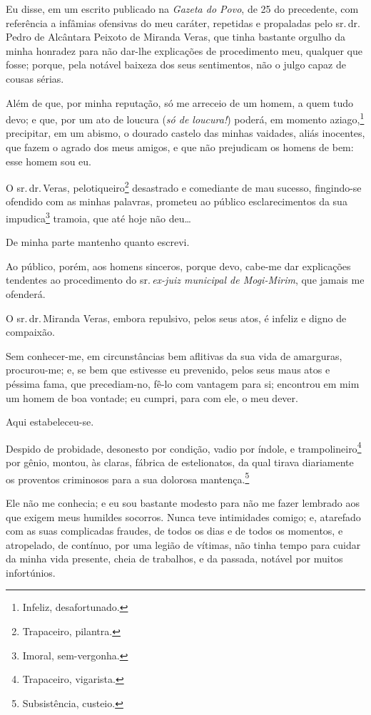 {Eu disse, em um escrito publicado na \emph{Gazeta do Povo}, de 25 do
precedente, com referência a infâmias ofensivas do meu caráter,
repetidas e propaladas pelo sr.\,dr.\,Pedro de Alcântara Peixoto de
Miranda Veras, que tinha bastante orgulho da minha honradez para não
dar-lhe explicações de procedimento meu, qualquer que fosse; porque,
pela notável baixeza dos seus sentimentos, não o julgo capaz de cousas
sérias.

Além de que, por minha reputação, só me arreceio de um homem, a quem
tudo devo; e que, por um ato de loucura (\emph{só de loucura!}) poderá,
em momento aziago,\footnote{Infeliz, desafortunado.} precipitar, em um
abismo, o dourado castelo das minhas vaidades, aliás inocentes, que
fazem o agrado dos meus amigos, e que não prejudicam os homens de bem:
esse homem sou eu.

O sr.\,dr.\,Veras, pelotiqueiro\footnote{Trapaceiro, pilantra.}
desastrado e comediante de mau sucesso, fingindo-se ofendido com as
minhas palavras, prometeu ao público esclarecimentos da sua
impudica\footnote{Imoral, sem-vergonha.} tramoia, que até hoje não
deu\ldots{}

De minha parte mantenho quanto escrevi.

Ao público, porém, aos homens sinceros, porque devo, cabe-me dar
explicações tendentes ao procedimento do sr.\,\emph{ex-juiz municipal de
Mogi-Mirim}, que jamais me ofenderá.

O sr.\,dr.\,Miranda Veras, embora repulsivo, pelos seus atos, é infeliz e
digno de compaixão.

Sem conhecer-me, em circunstâncias bem aflitivas da sua vida de
amarguras, procurou-me; e, se bem que estivesse eu prevenido, pelos seus
maus atos e péssima fama, que precediam-no, fê-lo com vantagem para si;
encontrou em mim um homem de boa vontade; eu cumpri, para com ele, o meu
dever.

Aqui estabeleceu-se.

Despido de probidade, desonesto por condição, vadio por índole, e
trampolineiro\footnote{Trapaceiro, vigarista.} por gênio, montou,
às claras, fábrica de estelionatos, da qual tirava diariamente os
proventos criminosos para a sua dolorosa mantença.\footnote{
  Subsistência, custeio.}

Ele não me conhecia; e eu sou bastante modesto para não me fazer
lembrado aos que exigem meus humildes socorros. Nunca teve intimidades
comigo; e, atarefado com as suas complicadas fraudes, de todos os dias e
de todos os momentos, e atropelado, de contínuo, por uma legião de
vítimas, não tinha tempo para cuidar da minha vida presente, cheia de
trabalhos, e da passada, notável por muitos infortúnios.

}
